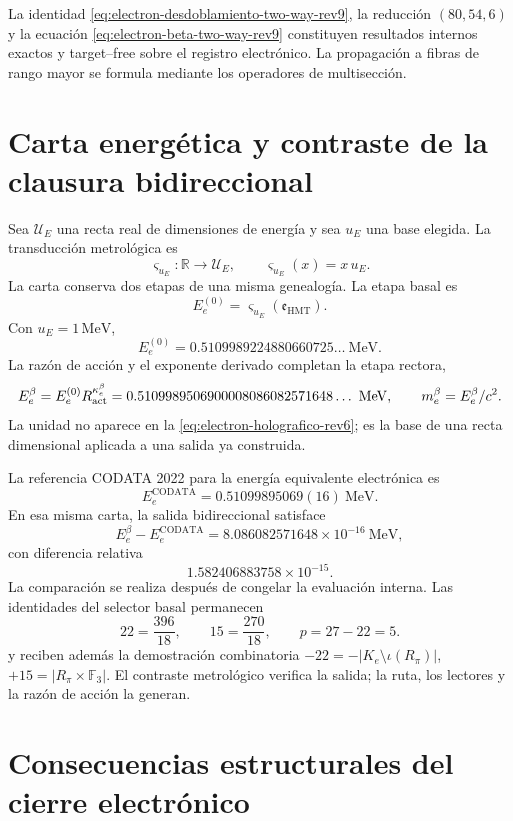 \begin{statusbox}[title={Clausura interna del refinamiento bidireccional}]
La identidad \eqref{eq:electron-desdoblamiento-two-way-rev9}, la reducción
\((80,54,6)\) y la ecuación
\eqref{eq:electron-beta-two-way-rev9} constituyen resultados internos exactos
y target--free sobre el registro electrónico. La propagación a fibras de
rango mayor se formula mediante los operadores de multisección.
\end{statusbox}

\section{Carta energética y contraste de la clausura bidireccional}

Sea \(\mathcal U_E\) una recta real de dimensiones de energía y sea
\(u_E\) una base elegida. La transducción metrológica es
\[
 \varsigma_{u_E}:\mathbb R\longrightarrow\mathcal U_E,
 \qquad
 \varsigma_{u_E}(x)=x\,u_E.
\]
La carta conserva dos etapas de una misma genealogía. La etapa basal es
\[
 E_e^{(0)}
 =
 \varsigma_{u_E}(\mathfrak e_{\mathrm{HMT}}).
\]
Con \(u_E=1\,\mathrm{MeV}\),
\[
 E_e^{(0)}
 =
 0.5109989224880660725\ldots\ \mathrm{MeV}.
\]
La razón de acción y el exponente derivado completan la etapa rectora,
\[
 E_e^\beta=E_e^{(0)}R_{\rm act}^{\kappa_e^\beta}
 =0.5109989506900008086082571648\ldots\ \mathrm{MeV},
 \qquad
 m_e^\beta=E_e^\beta/c^2.
\]
La unidad no aparece en la
\cref{eq:electron-holografico-rev6}; es la base de una recta dimensional
aplicada a una salida ya construida.

La referencia CODATA 2022 para la energía equivalente electrónica es
\cite{CODATA2022}
\[
 E_e^{\mathrm{CODATA}}
 =
 0.51099895069(16)\ \mathrm{MeV}.
\]
En esa misma carta, la salida bidireccional satisface
\[
 E_e^\beta-E_e^{\mathrm{CODATA}}
 =
 8.086082571648\times10^{-16}\ \mathrm{MeV},
\]
con diferencia relativa
\[
 1.582406883758\times10^{-15}.
\]
La comparación se realiza después de congelar la evaluación interna. Las
identidades del selector basal permanecen
\[
 22=\frac{396}{18},
 \qquad
 15=\frac{270}{18},
 \qquad
 p=27-22=5.
\]
y reciben además la demostración combinatoria
\(-22=-|K_e\setminus\iota(R_\pi)|\),
\(+15=|R_\pi\times\mathbb F_3|\). El contraste metrológico verifica la
salida; la ruta, los lectores y la razón de acción la generan.

\section{Consecuencias estructurales del cierre electrónico}

